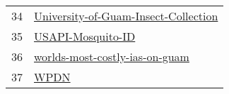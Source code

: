 \begin{longtable}{rl}
34 & \href{https://github.com/aubreymoore/University-of-Guam-Insect-Collection}{University-of-Guam-Insect-Collection} \\
35 &                                       \href{https://github.com/aubreymoore/USAPI-Mosquito-ID}{USAPI-Mosquito-ID} \\
36 &             \href{https://github.com/aubreymoore/worlds-most-costly-ias-on-guam}{worlds-most-costly-ias-on-guam} \\
37 &                                                                 \href{https://github.com/aubreymoore/WPDN}{WPDN} \\
\end{longtable}
